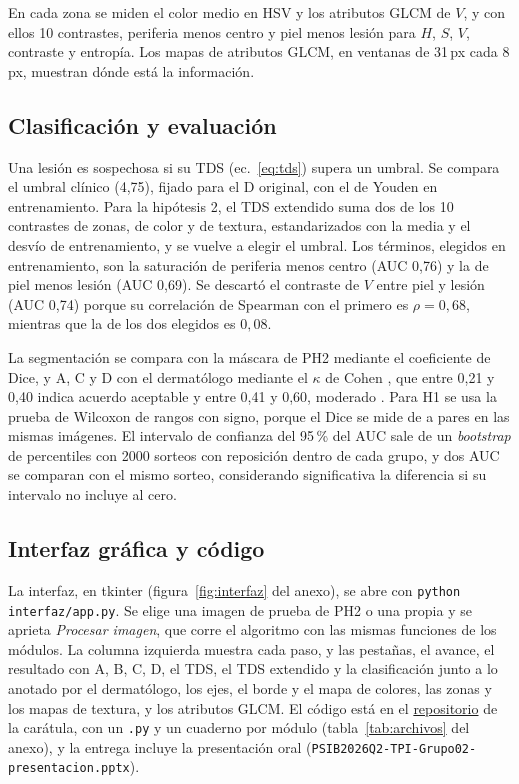 En cada zona se miden el color medio en HSV y los atributos GLCM de $V$, y con ellos 10 contrastes, periferia menos centro y piel menos lesión para $H$, $S$, $V$, contraste y entropía. Los mapas de atributos GLCM, en ventanas de 31\,px cada 8\,px, muestran dónde está la información.

\subsection{Clasificación y evaluación}
\label{sec:clasificacion}
\label{sec:evaluacion}
Una lesión es sospechosa si su TDS (ec.~\ref{eq:tds}) supera un umbral. Se compara el umbral clínico (4,75), fijado para el D original, con el de Youden en entrenamiento. Para la hipótesis 2, el TDS extendido suma dos de los 10 contrastes de zonas, de color y de textura, estandarizados con la media y el desvío de entrenamiento, y se vuelve a elegir el umbral. Los términos, elegidos en entrenamiento, son la saturación de periferia menos centro (AUC 0,76) y la de piel menos lesión (AUC 0,69). Se descartó el contraste de $V$ entre piel y lesión (AUC 0,74) porque su correlación de Spearman con el primero es $\rho=0{,}68$, mientras que la de los dos elegidos es $0{,}08$.

La segmentación se compara con la máscara de PH2 mediante el coeficiente de Dice, y A, C y D con el dermatólogo mediante el $\kappa$ de Cohen \parencite{cohen1960}, que entre 0,21 y 0,40 indica acuerdo aceptable y entre 0,41 y 0,60, moderado \parencite{landis1977}. Para H1 se usa la prueba de Wilcoxon de rangos con signo, porque el Dice se mide de a pares en las mismas imágenes. El intervalo de confianza del 95\,\% del AUC sale de un \emph{bootstrap} de percentiles con 2000 sorteos con reposición dentro de cada grupo, y dos AUC se comparan con el mismo sorteo, considerando significativa la diferencia si su intervalo no incluye al cero.

\subsection{Interfaz gráfica y código}
\label{sec:interfaz}
\label{sec:codigo}
La interfaz, en tkinter (figura~\ref{fig:interfaz} del anexo), se abre con \texttt{python interfaz/app.py}. Se elige una imagen de prueba de PH2 o una propia y se aprieta \emph{Procesar imagen}, que corre el algoritmo con las mismas funciones de los módulos. La columna izquierda muestra cada paso, y las pestañas, el avance, el resultado con A, B, C, D, el TDS, el TDS extendido y la clasificación junto a lo anotado por el dermatólogo, los ejes, el borde y el mapa de colores, las zonas y los mapas de textura, y los atributos GLCM. El código está en el \href{https://github.com/facortega/PSIB2026Q2-TPI-Grupo02-CassanoNieto-DElia-Ortega}{repositorio} de la carátula, con un \texttt{.py} y un cuaderno por módulo (tabla~\ref{tab:archivos} del anexo), y la entrega incluye la presentación oral (\texttt{PSIB2026Q2-TPI-Grupo02-presentacion.pptx}).
